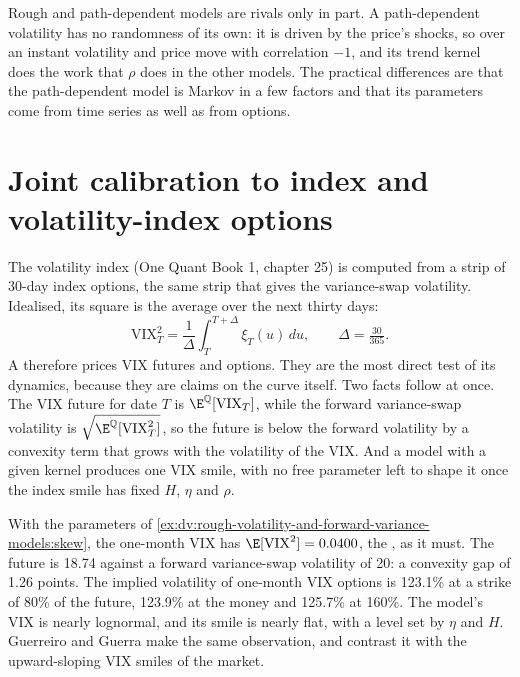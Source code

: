 Rough and path-dependent models are rivals only in part. A path-dependent volatility has no randomness of its
own: it is driven by the price's shocks, so over an instant volatility and price move with correlation $-1$,
and its trend kernel does the work that $\rho$ does in the other models. The practical differences are that
the path-dependent model is Markov in a few factors and that its parameters come from time series as well as
from options.

\section{Joint calibration to index and volatility-index options}

The volatility index (One Quant Book 1, chapter 25) is computed from a strip of 30-day index options, the same
strip that gives the variance-swap volatility. Idealised, its square is the average  over the
next thirty days:
\[
\mathrm{VIX}_T^2=\frac1\Delta\int_T^{T+\Delta}\xi_T(u)\,du,\qquad\Delta=\tfrac{30}{365}.
\]
A  therefore prices VIX futures and options. They are the most direct test of its
dynamics, because they are claims on the curve itself. Two facts follow at once. The VIX future for date
$T$ is $\E^{\mathbb Q}[\mathrm{VIX}_T]$, while the forward variance-swap volatility is
$\sqrt{\E^{\mathbb Q}[\mathrm{VIX}_T^2]}$, so the future is below the forward volatility by a convexity term
that grows with the volatility of the VIX. And a model with a given kernel produces one VIX smile, with no
free parameter left to shape it once the index smile has fixed $H$, $\eta$ and $\rho$.

\begin{example}\label{ex:dv:rough-volatility-and-forward-variance-models:vix}
With the parameters of \cref{ex:dv:rough-volatility-and-forward-variance-models:skew}, the one-month VIX has
$\E[\mathrm{VIX}^2]=0.0400$, the , as it must. The future is 18.74 against a forward
variance-swap volatility of 20: a convexity gap of 1.26 points. The implied volatility of one-month VIX
options is 123.1\% at a strike of 80\% of the future, 123.9\% at the money and 125.7\% at 160\%. The model's
VIX is nearly lognormal, and its smile is nearly flat, with a level set by $\eta$ and $H$. Guerreiro and Guerra
make the same observation, and contrast it with the upward-sloping VIX smiles of the market.
\end{example}

